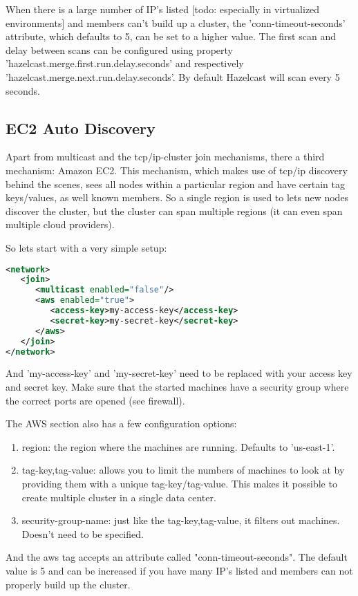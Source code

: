 When there is a large number of IP's listed [todo: especially in virtualized environments] and members can't build up a cluster, the 'conn-timeout-seconds' attribute, which defaults to 5, can be set to a higher value. The first scan and delay between scans can be configured using property 'hazelcast.merge.first.run.delay.seconds' and respectively 'hazelcast.merge.next.run.delay.seconds'. By default Hazelcast will scan every 5 seconds.

\subsection{EC2 Auto Discovery}
Apart from multicast and the tcp/ip-cluster join mechanisms, there a third mechanism: Amazon EC2. This mechanism, which makes use of tcp/ip discovery behind the scenes, sees all nodes within a particular region and have certain tag keys/values, as well known members. So a single region is used to lets new nodes discover the cluster, but the cluster can span multiple regions (it can even span multiple cloud providers).

So lets start with a very simple setup:
\begin{lstlisting}[language=xml]
<network>
   <join>
      <multicast enabled="false"/>
      <aws enabled="true">
         <access-key>my-access-key</access-key>
         <secret-key>my-secret-key</secret-key>
      </aws>
   </join>
</network>
\end{lstlisting}
And 'my-access-key' and 'my-secret-key' need to be replaced with your access key and secret key. Make sure that the started machines have a security group where the correct ports are opened (see firewall).

The AWS section also has a few configuration options:
\begin{enumerate}
\item region: the region where the machines are running. Defaults to 'us-east-1'.
\item tag-key,tag-value: allows you to limit the numbers of machines to look at by providing them with a unique tag-key/tag-value. This makes it possible to create multiple cluster in a single data center.
\item security-group-name: just like the tag-key,tag-value, it filters out machines. Doesn't need to be specified.
\end{enumerate}
And the aws tag accepts an attribute called "conn-timeout-seconds". The default value is 5 and can be increased  if you have many IP's listed and members can not properly build up the cluster.

